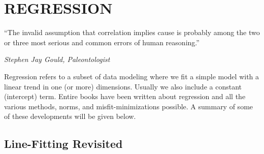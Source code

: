 %
\chapter{REGRESSION}
\label{ch:regression}
\epigraph{``The invalid assumption that correlation implies cause is probably among the two or three most serious and common errors of human reasoning.''}{\textit{Stephen Jay Gould, Paleontologist}}
Regression refers to a subset of data modeling where we fit a simple model with a linear trend in one (or more) dimensions.  Usually we also include a constant (intercept) term.  Entire books have been written about regression
and all the various methods, norms, and misfit-minimizations possible.  A summary of some of these developments will be given below.
\section{Line-Fitting Revisited}

